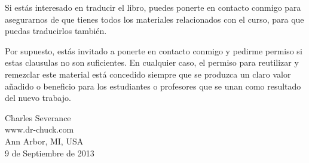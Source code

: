 Si estás interesado en traducir el libro, puedes ponerte en contacto conmigo
para asegurarnos de que tienes todos los materiales relacionados con el curso,
para que puedas traducirlos también.

Por supuesto, estás invitado a ponerte en contacto conmigo y pedirme permiso si estas
clausulas no son suficientes. En cualquier caso, el permiso para reutilizar y
remezclar este material está concedido siempre que se produzca un claro valor añadido
o beneficio para los estudiantes o profesores que se unan como resultado
del nuevo trabajo.

Charles Severance\\
www.dr-chuck.com\\
Ann Arbor, MI, USA\\
9 de Septiembre de 2013



\normalsize

\printindex

\clearemptydoublepage



